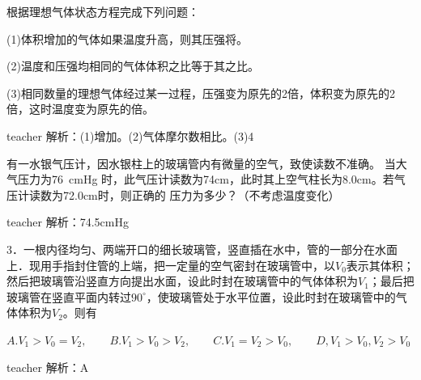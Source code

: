 \begin{example}
	根据理想气体状态方程完成下列问题：
	
	(1)体积增加的气体如果温度升高，则其压强将\kong\kong。
	
	(2)温度和压强均相同的气体体积之比等于其\kong\kong 之比。
	
	(3)相同数量的理想气体经过某一过程，压强变为原先的2倍，体积变为原先的2倍，这时温度变为原先的\kong 倍。
	
	
	\begin{taggedblock}{teacher}
		\noindent
		解析：(1)增加。(2)气体摩尔数相比。(3)4
	\end{taggedblock}
\end{example}



\begin{example}
	有一水银气压计，因水银柱上的玻璃管内有微量的空气，致使读数不准确。
	当大气压力为76~cmHg
	时，此气压计读数为74cm，此时其上空气柱长为8.0cm。若气压计读数为72.0cm时，则正确的 压力为多少？（不考虑温度变化）
	\begin{taggedblock}{teacher}
		\newline
		解析：74.5cmHg
	\end{taggedblock}
\end{example}

\begin{example}
	3．一根内径均匀、两端开口的细长玻璃管，竖直插在水中，管的一部分在水面上．现用手指封住管的上端，把一定量的空气密封在玻璃管中，以$ V_0$表示其体积；然后把玻璃管沿竖直方向提出水面，设此时封在玻璃管中的气体体积为$ V_1$；最后把玻璃管在竖直平面内转过$ 90^\circ$，使玻璃管处于水平位置，设此时封在玻璃管中的气体体积为$V_2$。则有
	
	$A. V_1>V_0=V_2,\qquad B. V_1>V_0>V_2,\qquad C.V_1=V_2>V_0,\qquad D, V_1>V_0,V_2>V_0$
	\begin{taggedblock}{teacher}
		\noindent
		解析：A
	\end{taggedblock}
\end{example}


